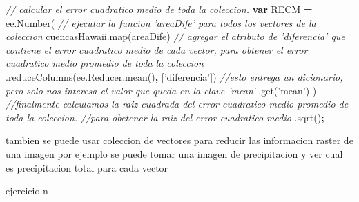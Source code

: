\documentclass[
]{article}
\newenvironment{Shaded}{\begin{snugshade}}{\end{snugshade}}
\newcommand{\AttributeTok}[1]{\textcolor[rgb]{0.77,0.63,0.00}{#1}}
\newcommand{\CommentTok}[1]{\textcolor[rgb]{0.56,0.35,0.01}{\textit{#1}}}
\newcommand{\KeywordTok}[1]{\textcolor[rgb]{0.13,0.29,0.53}{\textbf{#1}}}
\newcommand{\NormalTok}[1]{#1}
\newcommand{\OperatorTok}[1]{\textcolor[rgb]{0.81,0.36,0.00}{\textbf{#1}}}
\newcommand{\StringTok}[1]{\textcolor[rgb]{0.31,0.60,0.02}{#1}}
\newcommand{\VariableTok}[1]{\textcolor[rgb]{0.00,0.00,0.00}{#1}}
\begin{document}
\begin{Shaded}
\begin{Highlighting}[]
\CommentTok{// calcular el error cuadratico medio de toda la coleccion.}
\KeywordTok{var}\NormalTok{ RECM }\OperatorTok{=} \VariableTok{ee}\NormalTok{.}\AttributeTok{Number}\NormalTok{(}
  \CommentTok{// ejecutar la funcion 'areaDife' para todos los vectores de la coleccion}
  \VariableTok{cuencasHawaii}\NormalTok{.}\AttributeTok{map}\NormalTok{(areaDife)}
  \CommentTok{// agregar el atributo de 'diferencia' que contiene el error cuadratico medio de cada vector, para obtener el error cuadratico medio promedio de toda la coleccion}
\NormalTok{  .}\AttributeTok{reduceColumns}\NormalTok{(}\VariableTok{ee}\NormalTok{.}\VariableTok{Reducer}\NormalTok{.}\AttributeTok{mean}\NormalTok{()}\OperatorTok{,}\NormalTok{ [}\StringTok{'diferencia'}\NormalTok{])}
  \CommentTok{//esto entrega un dicionario, pero solo nos interesa el valor que queda en la clave 'mean'}
\NormalTok{  .}\AttributeTok{get}\NormalTok{(}\StringTok{'mean'}\NormalTok{)}
\NormalTok{)}
\CommentTok{//finalmente calculamos la raiz cuadrada del error cuadratico medio promedio de toda la coleccion.}
\CommentTok{//para obetener la raiz del error cuadratico medio}
\NormalTok{.}\AttributeTok{sqrt}\NormalTok{()}\OperatorTok{;}
\end{Highlighting}
\end{Shaded}

tambien se puede usar coleccion de vectores para reducir las informacion
raster de una imagen por ejemplo se puede tomar una imagen de
precipitacion y ver cual es precipitacion total para cada vector

ejercicio n
\end{document}
